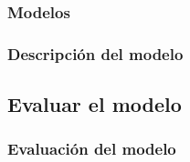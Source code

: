     \newpage
    \subsubsection{Modelos}

        \def\RUN{1}
        \def\title{Resultados de la corrida 1 del arbol de decisión J48}
        \def\algorithm{weka}
        \def\numberOfRules{17}
        \def\hasRules{1}
        
        \newpage

        \def\RUN{2}
        \def\title{Resultados de la corrida 2 del arbol de decisión J48}
        \def\algorithm{weka}
        \def\numberOfRules{20}
        \def\hasRules{1}
        
        \newpage

        \def\RUN{1}
        \def\title{Resultados de la corrida de Perceptron}
        \def\algorithm{perceptron}
        \def\numberOfRules{20}
        \def\hasRules{0}
        

    \subsubsection{Descripción del modelo}
\subsection{Evaluar el modelo}
    \subsubsection{Evaluación del modelo}
